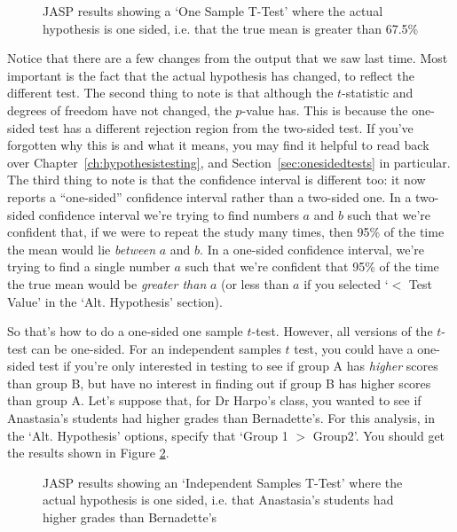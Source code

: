 \begin{figure}[htb]
\begin{center}
\caption{JASP results showing a `One Sample T-Test' where the actual hypothesis is one sided, i.e. that the true mean is greater than 67.5\%}
\label{fig:ttest_onesided1}
\HR
\end{center}
\end{figure}

Notice that there are a few changes from the output that we saw last time. Most important is the fact that the actual hypothesis has changed, to reflect the different test. The second thing to note is that although the $t$-statistic and degrees of freedom have not changed, the $p$-value has. This is because the one-sided test has a different rejection region from the two-sided test. If you've forgotten why this is and what it means, you may find it helpful to read back over Chapter~\ref{ch:hypothesistesting}, and Section~\ref{sec:onesidedtests} in particular. The third thing to note is that the confidence interval is different too: it now reports a ``one-sided'' confidence interval rather than a two-sided one. In a two-sided confidence interval we're trying to find numbers $a$ and $b$ such that we're confident that, if we were to repeat the study many times, then 95\% of the time the mean would lie {\it between} $a$ and $b$. In a one-sided confidence interval, we're trying to find a single number $a$ such that we're confident that 95\% of the time the true mean would be {\it greater than} $a$ (or less than $a$ if you selected `$<$ Test Value' in the `Alt. Hypothesis' section).

So that's how to do a one-sided one sample $t$-test. However, all versions of the $t$-test can be one-sided. For an independent samples $t$ test, you could have a one-sided test if you're only interested in testing to see if group A has {\it higher} scores than group B, but have no interest in finding out if group B has higher scores than group A. Let's suppose that, for Dr Harpo's class, you wanted to see if Anastasia's students had higher grades than Bernadette's. For this analysis, in the `Alt. Hypothesis' options, specify that `Group 1 $>$ Group2'. You should get the results shown in Figure \ref{fig:ttest_onesided2}.

\begin{figure}[htb]
\begin{center}
\caption{JASP results showing an `Independent Samples T-Test' where the actual hypothesis is one sided, i.e. that Anastasia's students had higher grades than Bernadette's}
\label{fig:ttest_onesided2}
\HR
\end{center}
\end{figure}

